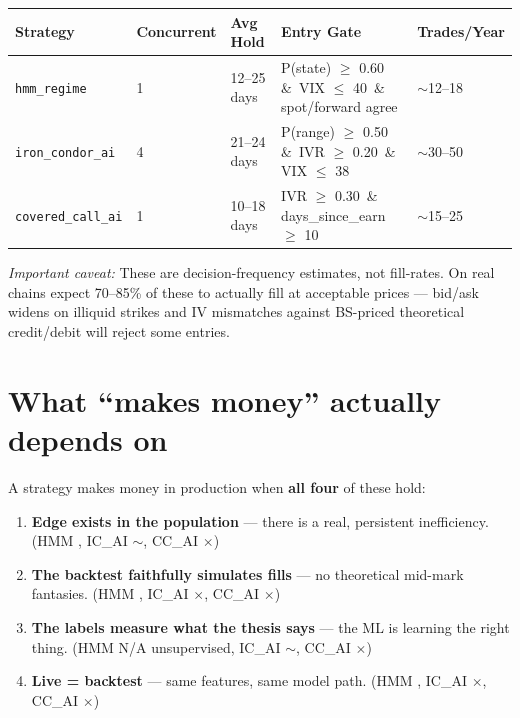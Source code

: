 \documentclass[11pt,a4paper]{article}
\begin{document}
\renewcommand{\arraystretch}{1.25}
\begin{center}
\small
\begin{tabular}{R{3.2cm} C{1.6cm} C{1.8cm} R{6.0cm} C{2.2cm}}
\toprule
\textbf{Strategy} & \textbf{Concurrent} & \textbf{Avg Hold} & \textbf{Entry Gate} & \textbf{Trades/Year}\\
\midrule
\texttt{hmm\_regime}      & 1 & 12--25 days & P(state) $\geq$ 0.60 \,\&\, VIX $\leq$ 40 \,\&\, spot/forward agree     & $\sim$12--18\\
\texttt{iron\_condor\_ai} & 4 & 21--24 days & P(range) $\geq$ 0.50 \,\&\, IVR $\geq$ 0.20 \,\&\, VIX $\leq$ 38       & $\sim$30--50\\
\texttt{covered\_call\_ai}& 1 & 10--18 days & IVR $\geq$ 0.30 \,\&\, days\_since\_earn $\geq$ 10                      & $\sim$15--25\\
\bottomrule
\end{tabular}
\end{center}

\textit{Important caveat:} These are decision-frequency estimates, not fill-rates. On real chains expect 70--85\% of these to actually fill at acceptable prices --- bid/ask widens on illiquid strikes and IV mismatches against BS-priced theoretical credit/debit will reject some entries.

\section*{What ``makes money'' actually depends on}

A strategy makes money in production when \textbf{all four} of these hold:

\begin{enumerate}[leftmargin=*,itemsep=2pt]
  \item \textbf{Edge exists in the population} --- there is a real, persistent inefficiency. (HMM \checkmark, IC\_AI $\sim$, CC\_AI $\times$)
  \item \textbf{The backtest faithfully simulates fills} --- no theoretical mid-mark fantasies. (HMM \checkmark, IC\_AI $\times$, CC\_AI $\times$)
  \item \textbf{The labels measure what the thesis says} --- the ML is learning the right thing. (HMM N/A unsupervised, IC\_AI $\sim$, CC\_AI $\times$)
  \item \textbf{Live = backtest} --- same features, same model path. (HMM \checkmark, IC\_AI $\times$, CC\_AI $\times$)
\end{enumerate}
\end{document}
